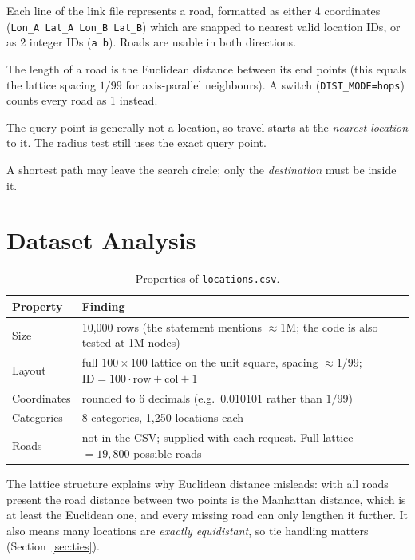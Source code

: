 \documentclass[11pt,a4paper]{article}
\newcommand{\code}[1]{\texttt{#1}}
\begin{document}
\begin{description}[leftmargin=1.2cm,labelwidth=1cm,font=\bfseries]
\item[A1] Each line of the link file represents a road, formatted as either 4 coordinates (\code{Lon\_A Lat\_A Lon\_B Lat\_B}) which are snapped to nearest valid location IDs, or as 2 integer IDs (\code{a b}). Roads are usable in both directions.
\item[A2] The length of a road is the Euclidean distance between its end points (this equals the lattice spacing $1/99$ for axis-parallel neighbours). A switch (\code{DIST\_MODE=hops}) counts every road as 1 instead.
\item[A3] The query point is generally not a location, so travel starts at the \emph{nearest location} to it. The radius test still uses the exact query point.
\item[A4] A shortest path may leave the search circle; only the \emph{destination} must be inside it.
\end{description}

\section{Dataset Analysis}
\begin{table}[h]\centering\small
\begin{tabular}{@{}ll@{}}\toprule
\textbf{Property} & \textbf{Finding}\\\midrule
Size & 10{,}000 rows (the statement mentions $\approx$1M; the code is also tested at 1M nodes)\\
Layout & full $100\times100$ lattice on the unit square, spacing $\approx 1/99$; $\mathrm{ID}=100\cdot\mathrm{row}+\mathrm{col}+1$\\
Coordinates & rounded to 6 decimals (e.g.\ 0.010101 rather than $1/99$)\\
Categories & 8 categories, 1{,}250 locations each\\
Roads & not in the CSV; supplied with each request. Full lattice $=19{,}800$ possible roads\\\bottomrule
\end{tabular}
\caption{Properties of \code{locations.csv}.}
\end{table}
The lattice structure explains why Euclidean distance misleads: with all roads present the road distance between two
points is the Manhattan distance, which is at least the Euclidean one, and every missing road can only lengthen it further.
It also means many locations are \emph{exactly equidistant}, so tie handling matters (Section~\ref{sec:ties}).
\end{document}
